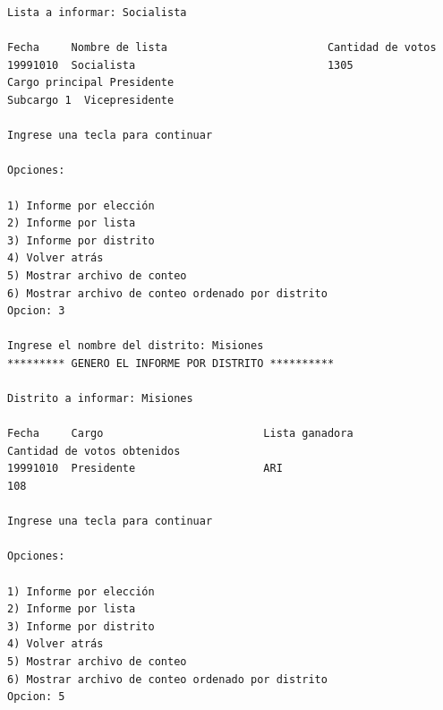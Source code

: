 \documentclass[a4paper,10pt]{article}
\begin{document}
\begin{verbatim}
Lista a informar: Socialista

Fecha     Nombre de lista                         Cantidad de votos
19991010  Socialista                              1305           
Cargo principal	Presidente
Subcargo 1	Vicepresidente

Ingrese una tecla para continuar

Opciones: 

1) Informe por elección
2) Informe por lista
3) Informe por distrito
4) Volver atrás
5) Mostrar archivo de conteo
6) Mostrar archivo de conteo ordenado por distrito
Opcion: 3

Ingrese el nombre del distrito: Misiones
********* GENERO EL INFORME POR DISTRITO **********

Distrito a informar: Misiones

Fecha     Cargo                         Lista ganadora                          Cantidad de votos obtenidos
19991010  Presidente                    ARI                                     108            

Ingrese una tecla para continuar

Opciones: 

1) Informe por elección
2) Informe por lista
3) Informe por distrito
4) Volver atrás
5) Mostrar archivo de conteo
6) Mostrar archivo de conteo ordenado por distrito
Opcion: 5


\end{verbatim}
\end{document}
